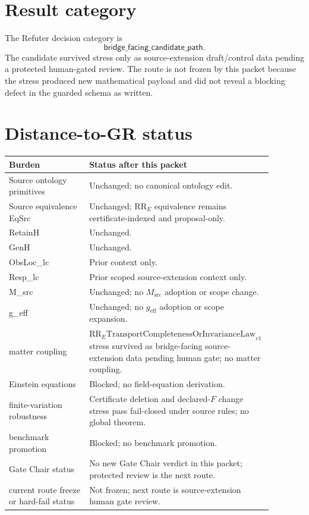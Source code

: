 \documentclass[11pt]{article}
\newcommand{\RRE}{\mathrm{RR}_{E}}
\newcommand{\LawRR}{\mathrm{RR}_{E}\mathrm{TransportCompletenessOrInvarianceLaw}_{v1}}
\newcommand{\geff}{g_{\mathrm{eff}}}
\begin{document}
\section{Result category}

The Refuter decision category is
\[
  \mathsf{bridge\_facing\_candidate\_path}.
\]
The candidate survived stress only as source-extension draft/control data
pending a protected human-gated review. The route is not frozen by this
packet because the stress produced new mathematical payload and did not reveal
a blocking defect in the guarded schema as written.

\section{Distance-to-GR status}

\begin{longtable}{p{0.30\linewidth}p{0.58\linewidth}}
\toprule
Burden & Status after this packet \\
\midrule
Source ontology primitives & Unchanged; no canonical ontology edit. \\
Source equivalence EqSrc & Unchanged; \(\RRE\) equivalence remains certificate-indexed and proposal-only. \\
RetainH & Unchanged. \\
GenH & Unchanged. \\
ObsLoc\_lc & Prior context only. \\
Resp\_lc & Prior scoped source-extension context only. \\
M\_src & Unchanged; no \(M_{\mathrm{src}}\) adoption or scope change. \\
g\_eff & Unchanged; no \(\geff\) adoption or scope expansion. \\
matter coupling & \(\LawRR\) stress survived as bridge-facing source-extension data pending human gate; no matter coupling. \\
Einstein equations & Blocked; no field-equation derivation. \\
finite-variation robustness & Certificate deletion and declared-\(F\) change stress pass fail-closed under source rules; no global theorem. \\
benchmark promotion & Blocked; no benchmark promotion. \\
Gate Chair status & No new Gate Chair verdict in this packet; protected review is the next route. \\
current route freeze or hard-fail status & Not frozen; next route is source-extension human gate review. \\
\bottomrule
\end{longtable}
\end{document}
